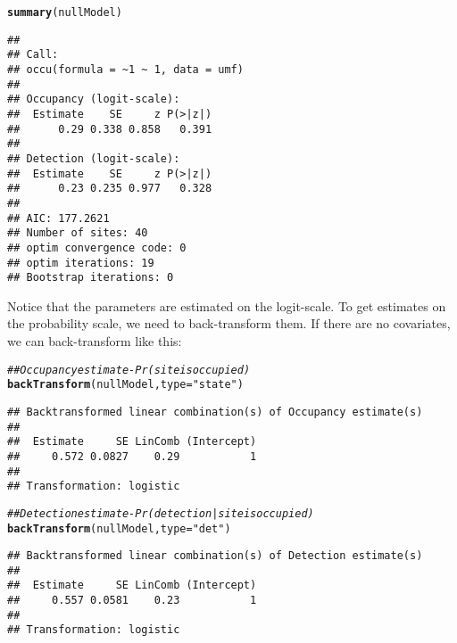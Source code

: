 \documentclass[12pt]{article}\usepackage[]{graphicx}\usepackage[]{xcolor}
\makeatletter
\newcommand{\hlstr}[1]{\textcolor[rgb]{0.192,0.494,0.8}{#1}}%
\newcommand{\hlcom}[1]{\textcolor[rgb]{0.678,0.584,0.686}{\textit{#1}}}%
\newcommand{\hlstd}[1]{\textcolor[rgb]{0.345,0.345,0.345}{#1}}%
\newcommand{\hlkwc}[1]{\textcolor[rgb]{0.333,0.667,0.333}{#1}}%
\newcommand{\hlkwd}[1]{\textcolor[rgb]{0.737,0.353,0.396}{\textbf{#1}}}%
\newenvironment{kframe}{%
 \def\at@end@of@kframe{}%
 \ifinner\ifhmode%
  \def\at@end@of@kframe{\end{minipage}}%
  \begin{minipage}{\columnwidth}%
 \fi\fi%
 \def\FrameCommand##1{\hskip\@totalleftmargin \hskip-\fboxsep
 \colorbox{shadecolor}{##1}\hskip-\fboxsep
     \hskip-\linewidth \hskip-\@totalleftmargin \hskip\columnwidth}%
 \MakeFramed {\advance\hsize-\width
   \@totalleftmargin\z@ \linewidth\hsize
   \@setminipage}}%
 {\par\unskip\endMakeFramed%
 \at@end@of@kframe}
\newenvironment{knitrout}{}{} %
\makeatother
\begin{document}
\begin{knitrout}
\color{fgcolor}\begin{kframe}
\begin{alltt}
\hlkwd{summary}\hlstd{(nullModel)}
\end{alltt}
\begin{verbatim}
## 
## Call:
## occu(formula = ~1 ~ 1, data = umf)
## 
## Occupancy (logit-scale):
##  Estimate    SE     z P(>|z|)
##      0.29 0.338 0.858   0.391
## 
## Detection (logit-scale):
##  Estimate    SE     z P(>|z|)
##      0.23 0.235 0.977   0.328
## 
## AIC: 177.2621 
## Number of sites: 40
## optim convergence code: 0
## optim iterations: 19 
## Bootstrap iterations: 0
\end{verbatim}
\end{kframe}
\end{knitrout}

Notice that the parameters are estimated on the logit-scale. To get
estimates on the probability scale, we need to back-transform them. If
there are no covariates, we can back-transform like this: 

\begin{knitrout}
\color{fgcolor}\begin{kframe}
\begin{alltt}
\hlcom{## Occupancy estimate - Pr(site is occupied)}
\hlkwd{backTransform}\hlstd{(nullModel,} \hlkwc{type}\hlstd{=}\hlstr{"state"}\hlstd{)}
\end{alltt}
\begin{verbatim}
## Backtransformed linear combination(s) of Occupancy estimate(s)
## 
##  Estimate     SE LinComb (Intercept)
##     0.572 0.0827    0.29           1
## 
## Transformation: logistic
\end{verbatim}
\begin{alltt}
\hlcom{## Detection estimate - Pr(detection | site is occupied)}
\hlkwd{backTransform}\hlstd{(nullModel,} \hlkwc{type}\hlstd{=}\hlstr{"det"}\hlstd{)}
\end{alltt}
\begin{verbatim}
## Backtransformed linear combination(s) of Detection estimate(s)
## 
##  Estimate     SE LinComb (Intercept)
##     0.557 0.0581    0.23           1
## 
## Transformation: logistic
\end{verbatim}
\end{kframe}
\end{knitrout}
\end{document}
